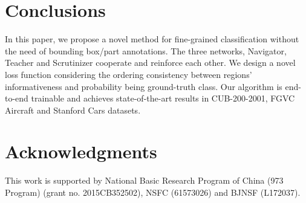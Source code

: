 \documentclass[runningheads]{llncs}
\begin{document}
\section{Conclusions}\label{conclusion}
In this paper, we propose a novel method for fine-grained classification without the need of bounding box/part annotations. The three networks, Navigator, Teacher and Scrutinizer cooperate and reinforce each other. We design a novel loss function considering the ordering consistency between regions' informativeness and probability being ground-truth class. Our algorithm is end-to-end trainable and achieves state-of-the-art results in CUB-200-2001, FGVC Aircraft and Stanford Cars datasets.

\section{Acknowledgments}
This work is supported by National Basic Research Program of China (973 Program) (grant no. 2015CB352502), NSFC (61573026) and BJNSF (L172037).
\end{document}
